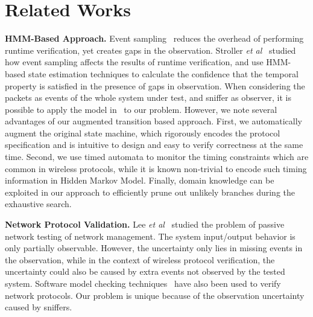 \section{Related Works}
\label{sec:related}

\textbf{HMM-Based Approach.} Event
sampling~\cite{bonakdarpour2011sampling,hauswirth2004low,arnold2008qvm,fei2006artemis}
reduces the overhead of performing runtime verification, yet creates gaps in the
observation. Stroller \textit{et al}~\cite{stoller2011runtime} studied how event
sampling affects the results of runtime verification, and use HMM-based state
estimation techniques to calculate the confidence that the temporal property is
satisfied in the presence of gaps in observation. When considering the packets
as events of the whole system under test, and sniffer as observer, it is
possible to apply the model in~\cite{stoller2011runtime} to our problem.
However, we note several advantages of our augmented transition based approach.
First, we automatically augment the original state machine, which rigorously
encodes the protocol specification and is intuitive to design and easy to verify
correctness at the same time. Second, we use timed automata to monitor the
timing constraints which are common in wireless protocols, while it is known
non-trivial to encode such timing information in Hidden Markov Model. Finally,
domain knowledge can be exploited in our approach to efficiently prune out
unlikely branches during the exhaustive search.

\textbf{Network Protocol Validation.} Lee \textit{et al}~\cite{lee1997passive}
studied the problem of passive network testing of network management. The system
input/output behavior is only partially observable. However, the uncertainty
only lies in missing events in the observation, while in the context of wireless
protocol verification, the uncertainty could also be caused by extra events not
observed by the tested system. Software model checking
techniques~\cite{musuvathi2002cmc,godefroid1997model} have also been used to
verify network protocols. Our problem is unique because of the observation
uncertainty caused by sniffers.

